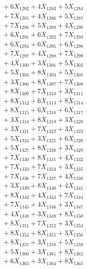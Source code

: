 \documentclass[a4paper,10pt]{article}
\begin{document}
{\begin{align}
&\;  + 6 X_{1282} + 4 X_{1283} + 5 X_{1284} \\[0.3ex]
&\;  + 7 X_{1285} + 4 X_{1286} + 5 X_{1287} \\[0.3ex]
&\;  + 7 X_{1288} + 5 X_{1289} + 4 X_{1290} \\[0.3ex]
&\;  + 6 X_{1291} + 6 X_{1292} + 7 X_{1293} \\[0.3ex]
&\;  + 6 X_{1294} + 6 X_{1295} + 6 X_{1296} \\[0.3ex]
&\;  + 7 X_{1297} + 4 X_{1298} + 7 X_{1299} \\[0.5ex]\allowbreak
&\;  + 4 X_{1300} + 3 X_{1301} + 5 X_{1302} \\[0.3ex]
&\;  + 5 X_{1303} + 8 X_{1304} + 5 X_{1305} \\[0.3ex]
&\;  + 3 X_{1306} + 8 X_{1307} + 7 X_{1308} \\[0.3ex]
&\;  + 8 X_{1309} + 7 X_{1310} + 3 X_{1311} \\[0.3ex]
&\;  + 8 X_{1312} + 6 X_{1313} + 8 X_{1314} \\[0.3ex]
&\;  + 8 X_{1315} + 6 X_{1316} + 6 X_{1317} \\[0.3ex]
&\;  + 3 X_{1318} + 8 X_{1319} + 3 X_{1320} \\[0.3ex]
&\;  + 3 X_{1321} + 7 X_{1322} + 3 X_{1323} \\[0.3ex]
&\;  + 5 X_{1324} + 3 X_{1325} + 6 X_{1326} \\[0.3ex]
&\;  + 5 X_{1327} + 8 X_{1328} + 3 X_{1329} \\[0.5ex]\allowbreak
&\;  + 7 X_{1330} + 8 X_{1331} + 4 X_{1332} \\[0.3ex]
&\;  + 7 X_{1333} + 7 X_{1334} + 3 X_{1335} \\[0.3ex]
&\;  + 7 X_{1336} + 7 X_{1337} + 4 X_{1338} \\[0.3ex]
&\;  + 3 X_{1339} + 8 X_{1340} + 4 X_{1341} \\[0.3ex]
&\;  + 8 X_{1342} + 4 X_{1343} + 7 X_{1344} \\[0.3ex]
&\;  + 7 X_{1345} + 4 X_{1346} + 3 X_{1347} \\[0.3ex]
&\;  + 4 X_{1348} + 3 X_{1349} + 8 X_{1350} \\[0.3ex]
&\;  + 8 X_{1351} + 7 X_{1352} + 3 X_{1353} \\[0.3ex]
&\;  + 8 X_{1354} + 8 X_{1355} + 3 X_{1356} \\[0.3ex]
&\;  + 8 X_{1357} + 3 X_{1358} + 5 X_{1359} \\[0.5ex]\allowbreak
&\;  + 5 X_{1360} + 3 X_{1361} + 8 X_{1362} \\[0.3ex]
&\;  + 6 X_{1363} + 3 X_{1364} + 8 X_{1365} \\[0.3ex]

\end{align}}
\end{document}
